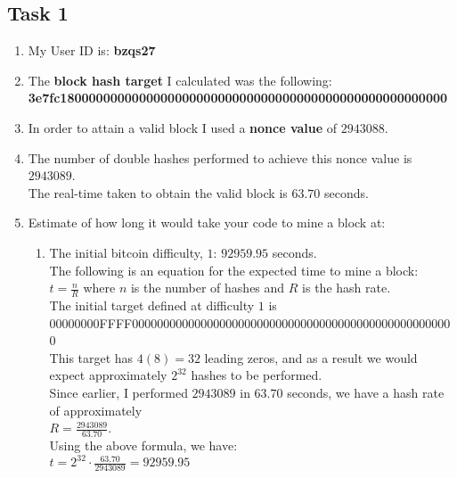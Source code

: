 \documentclass[12pt, a4paper]{article}
\begin{document}
\subsection*{Task 1}
\begin{enumerate}
\item My User ID is: \textbf{bzqs27}
\item The \textbf{block hash target} I calculated was the following:\\
\phantom{abc} \textbf{3e7fc180000000000000000000000000000000000000000000000000000}
\item In order to attain a valid block I used a \textbf{nonce value} of $2943088$.
\item The number of double hashes performed to achieve this nonce value is $2943089$.\\ 
The real-time taken to obtain the valid block is $63.70$ seconds.
\item Estimate of how long it would take your code to mine a block at:
\begin{enumerate}
\item The initial bitcoin difficulty, $1$: $92959.95$ seconds.\\
\phantom{a}The following is an equation for the expected time to mine a block:\\
\phantom{abc}$t = \frac{n}{R}$ where $n$ is the number of hashes and $R$ is the hash rate.\\
\phantom{a}The initial target defined at difficulty $1$ is\\
\phantom{abc}00000000FFFF0000000000000000000000000000000000000000000000000000\\ \phantom{a}This target has $4(8) = 32$ leading zeros, and as a result we would expect approximately \phantom{a}$2^{32}$ hashes to be performed.\\
\phantom{a}Since earlier, I performed $2943089$ in $63.70$ seconds, we have a hash rate of approximately \\ \phantom{a}$R = \frac{2943089}{63.70}$.\\
\phantom{a}Using the above formula, we have:\\
\phantom{abc} $t = 2^{32} \cdot  \frac{63.70}{2943089} = 92959.95$


\end{enumerate}
\end{enumerate}
\end{document}

